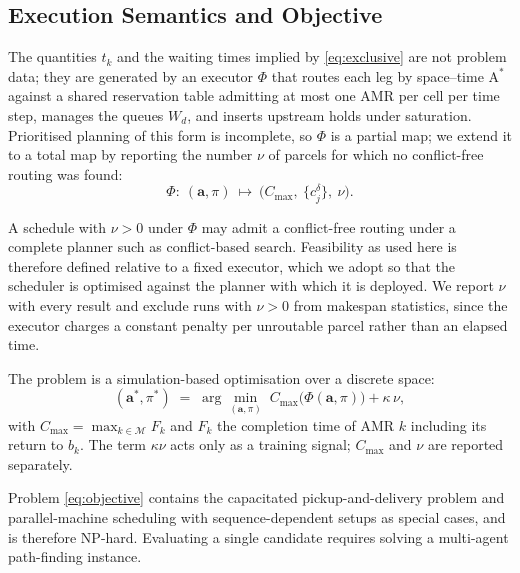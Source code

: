 \subsection{Execution Semantics and Objective}
\label{sec:execution}

The quantities $t_k$ and the waiting times implied by \eqref{eq:exclusive}
are not problem data; they are generated by an executor $\Phi$ that routes
each leg by space--time $\mathrm{A}^{*}$ against a shared reservation table
admitting at most one AMR per cell per time step, manages the queues $W_d$,
and inserts upstream holds under saturation. Prioritised planning of this
form is incomplete, so $\Phi$ is a partial map; we extend it to a total map
by reporting the number $\nu$ of parcels for which no conflict-free routing
was found:
\begin{equation}
\Phi:\ (\bm{a},\pi)\ \longmapsto\ \big(C_{\max},\ \{c^{\delta}_j\},\ \nu\big).
\label{eq:executor}
\end{equation}

\begin{remark}
\label{rem:relative}
A schedule with $\nu>0$ under $\Phi$ may admit a conflict-free routing under
a complete planner such as conflict-based search. Feasibility as used here is
therefore defined relative to a fixed executor, which we adopt so that the
scheduler is optimised against the planner with which it is deployed. We
report $\nu$ with every result and exclude runs with $\nu>0$ from makespan
statistics, since the executor charges a constant penalty per unroutable
parcel rather than an elapsed time.
\end{remark}

The problem is a simulation-based optimisation over a discrete space:
\begin{equation}
(\bm{a}^{*},\pi^{*}) \;=\;
\arg\min_{(\bm{a},\pi)}\; C_{\max}\big(\Phi(\bm{a},\pi)\big) + \kappa\,\nu ,
\label{eq:objective}
\end{equation}
with $C_{\max}=\max_{k\in\mathcal{M}}F_k$ and $F_k$ the completion time of
AMR $k$ including its return to $b_k$. The term $\kappa\nu$ acts only as a
training signal; $C_{\max}$ and $\nu$ are reported separately.

Problem \eqref{eq:objective} contains the capacitated pickup-and-delivery
problem and parallel-machine scheduling with sequence-dependent setups as
special cases, and is therefore NP-hard. Evaluating a single candidate
requires solving a multi-agent path-finding instance.

